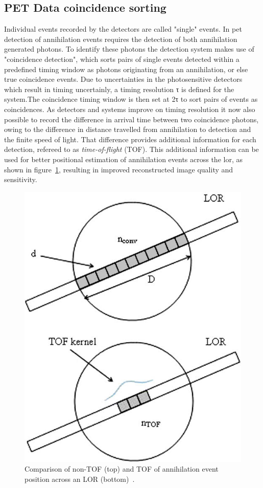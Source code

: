 \subsection{PET Data coincidence sorting}
Individual events recorded by the detectors are called "single" events. In \gls{pet} detection of annihilation events requires the detection of both annihilation generated photons. To identify these photons the detection system makes use of "coincidence detection", which sorts pairs of single events detected within a predefined timing window as photons originating from an annihilation, or else true coincidence events. 
Due to uncertainties in the photosensitive detectors which result in timing uncertainly, a timing resolution τ is defined for the system.The coincidence timing window is then set at 2τ to sort pairs of events as coincidences.
As detectors and systems improve on timing resolution it now also possible to record the difference in arrival time between two coincidence photons, owing to the difference in distance travelled from annihilation to detection and the finite speed of light. That difference provides additional information for each detection, refereed to as \textit{time-of-flight} (TOF). This additional information can be used for better positional estimation of annihilation events across the \gls{lor}, as shown in figure~\ref{fig_2:TOF_bin}, resulting in improved reconstructed image quality and sensitivity.
%
%
\begin{figure} [h!]
\centering
\includegraphics[scale=0.55,angle=0]{2_Theory_Methods/figures/TOF_bin.png}
\caption{Comparison of non-TOF (top) and TOF of annihilation event position across an LOR (bottom)~\cite{Conti2009}.} 
\label{fig_2:TOF_bin}
\end{figure} 
